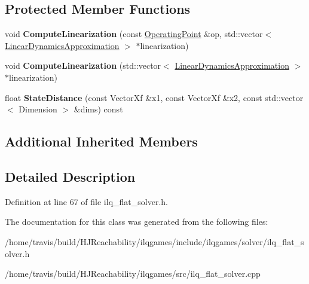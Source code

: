 \subsection*{Protected Member Functions}
\begin{DoxyCompactItemize}
\item 
void {\bfseries Compute\+Linearization} (const \hyperlink{structilqgames_1_1_operating_point}{Operating\+Point} \&op, std\+::vector$<$ \hyperlink{structilqgames_1_1_linear_dynamics_approximation}{Linear\+Dynamics\+Approximation} $>$ $\ast$linearization)\hypertarget{classilqgames_1_1_i_l_q_flat_solver_abcaec1afcd87975d5d9af23bae154939}{}\label{classilqgames_1_1_i_l_q_flat_solver_abcaec1afcd87975d5d9af23bae154939}

\item 
void {\bfseries Compute\+Linearization} (std\+::vector$<$ \hyperlink{structilqgames_1_1_linear_dynamics_approximation}{Linear\+Dynamics\+Approximation} $>$ $\ast$linearization)\hypertarget{classilqgames_1_1_i_l_q_flat_solver_a62a5f589fa336023dada5826b006b473}{}\label{classilqgames_1_1_i_l_q_flat_solver_a62a5f589fa336023dada5826b006b473}

\item 
float {\bfseries State\+Distance} (const Vector\+Xf \&x1, const Vector\+Xf \&x2, const std\+::vector$<$ Dimension $>$ \&dims) const \hypertarget{classilqgames_1_1_i_l_q_flat_solver_a75bc41b8d86d87d1af99d2daf8a75678}{}\label{classilqgames_1_1_i_l_q_flat_solver_a75bc41b8d86d87d1af99d2daf8a75678}

\end{DoxyCompactItemize}
\subsection*{Additional Inherited Members}


\subsection{Detailed Description}


Definition at line 67 of file ilq\+\_\+flat\+\_\+solver.\+h.



The documentation for this class was generated from the following files\+:\begin{DoxyCompactItemize}
\item 
/home/travis/build/\+H\+J\+Reachability/ilqgames/include/ilqgames/solver/ilq\+\_\+flat\+\_\+solver.\+h\item 
/home/travis/build/\+H\+J\+Reachability/ilqgames/src/ilq\+\_\+flat\+\_\+solver.\+cpp\end{DoxyCompactItemize}
